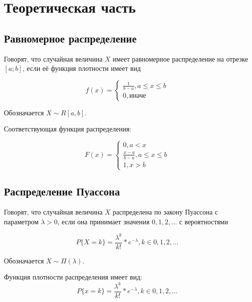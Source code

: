 \chapter{Теоретическая часть}

\section{Равномерное распределение}

Говорят, что случайная величина \(X\) имеет равномерное распределение на отрезке \([a; b]\), если её функция плотности имеет вид

\begin{equation}
    f(x) = \begin{cases}
        \frac{1}{b - a}, a \le x \le b \\
        0, \text{иначе}
    \end{cases}
\end{equation}

Обозначается \(X \sim R[a, b] \).

Соответствующая функция распределения:

\begin{equation}
    F(x) = \begin{cases}
        0, a < x \\
        \frac{x - a}{b - a}, a \le x \le b \\
        1, x > b
    \end{cases}
\end{equation}

\section{Распределение Пуассона}

Говорят, что случайная величина \(X\) распределена по закону Пуассона с параметром \(\lambda > 0\), если она принимает значения \(0, 1, 2, \dots\) с вероятностями

\begin{equation}
    P\{X = k\} = \frac{\lambda^k}{k!}*e^{-\lambda}, k \in {0, 1, 2, \dots}
\end{equation}

Обозначается \(X \sim \Pi(\lambda)\).

Функция плотности распределения имеет вид:
\begin{equation}
    P\{x = k\} = \frac{\lambda^k}{k!}*e^{-\lambda}, k \in {0, 1, 2, \dots}
\end{equation}

